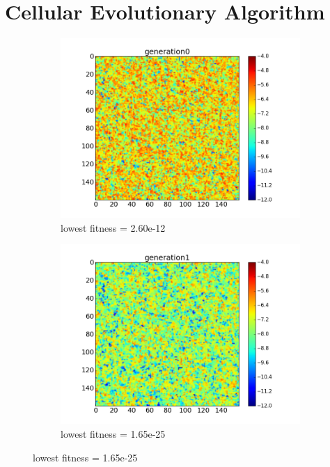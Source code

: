 \documentclass{article}
\begin{document}
\section{Cellular Evolutionary Algorithm}
\begin{figure}
	\centering
		\begin{subfigure}[b]{0.4\textwidth}
			\includegraphics[width=\textwidth]{images/CEA/simulation1/generation0}
			\caption{lowest fitness = 2.60e-12}
		\end{subfigure}
		\begin{subfigure}[b]{0.4\textwidth}
			\includegraphics[width=\textwidth]{images/CEA/simulation1/generation1}
			\caption{lowest fitness = 1.65e-25}
		\end{subfigure}

\end{figure}
\end{document}

